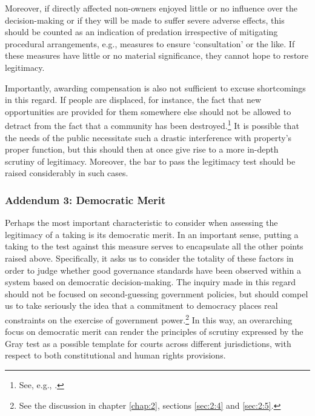 
Moreover, if directly affected non-owners enjoyed little or no influence over the decision-making or if they will be made to suffer severe adverse effects, this should be counted as an indication of predation irrespective of mitigating procedural arrangements, e.g., measures to ensure `consultation' or the like. If these measures have little or no material significance, they cannot hope to restore legitimacy.

Importantly, awarding compensation is also not sufficient to excuse shortcomings in this regard. If people are displaced, for instance, the fact that new opportunities are provided for them somewhere else should not be allowed to detract from the fact that a community has been destroyed.\footnote{See, e.g., \cite{cullet01}.} It is possible that the needs of the public necessitate such a drastic interference with property's proper function, but this should then at once give rise to a more in-depth scrutiny of legitimacy. Moreover, the bar to pass the legitimacy test should be raised considerably in such cases.

\subsubsection*{Addendum 3: Democratic Merit}

Perhaps the most important characteristic to consider when assessing the legitimacy of a taking is its democratic merit. In an important sense, putting a taking to the test against this measure serves to encapsulate all the other points raised above. Specifically, it asks us to consider the totality of these factors in order to judge whether good governance standards have been observed within a system based on democratic decision-making. The inquiry made in this regard should not be focused on second-guessing government policies, but should compel us to take seriously the idea that a commitment to democracy places real constraints on the exercise of government power.\footnote{See the discussion in chapter \ref{chap:2}, sections \ref{sec:2:4} and \ref{sec:2:5}.} In this way, an overarching focus on democratic merit can render the principles of scrutiny expressed by the Gray test as a possible template for courts across different jurisdictions, with respect to both constitutional and human rights provisions.

